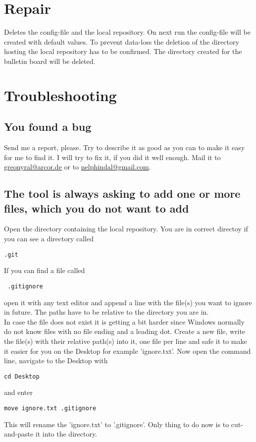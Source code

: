\documentclass[10pt,a4paper,oneside]{article}
\begin{document}
\newpage
\section{Repair}
Deletes the config-file and the local repository. On next run the config-file will be created with default values. To prevent data-loss the deletion of the directory hosting the local repository has to be confirmed. The directory created for the bulletin board will be deleted.

\newpage
\section{Troubleshooting}
\label{Trouble}

\subsection{You found a bug}
\label{bug}
Send me a report, please. Try to describe it as good as you can to make it easy for me to find it. I will try to fix it, if you did it well enough. Mail it to \href{mailto:greonyral@arcor.de}{greonyral@arcor.de} or to \href{mailto:nelphindal@gmail.com}{nelphindal@gmail.com}.

\subsection{The tool is always asking to add one or more files, which you do not want to add}
\label{Ignore}
 Open the directory containing the local repository. You are in correct directoy if you can see a directory called
\begin{verbatim}
.git
\end{verbatim} If you can find a file called 
\begin{verbatim}
 .gitignore
\end{verbatim} open it with any text editor and append a line with the file(s) you want to ignore in future. The paths have to be relative to the directory you are in.\\
In case the file does not exist it is getting a bit harder since Windows normally do not know files with no file ending and a leading dot. Create a new file, write the file(s) with their relative path(s) into it, one file per line and safe it to make it easier for you on the Desktop for example 'ignore.txt'. Now open the command line, navigate to the Desktop with \begin{verbatim}cd Desktop\end{verbatim} and enter \begin{verbatim}move ignore.txt .gitignore\end{verbatim} This will rename the 'ignore.txt' to '.gitignore'. Only thing to do now is to cut-and-paste it into the directory.
\end{document}

